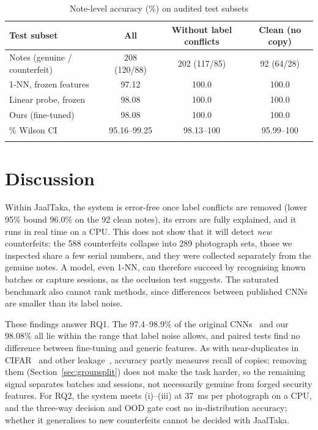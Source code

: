 \documentclass[pdflatex,iicol,sn-mathphys-num]{sn-jnl}
\begin{document}
\begin{table}[!tp]
\caption{Note-level accuracy (\%) on audited test subsets}\label{tab:clean}
\begin{tabular*}{\textwidth}{@{\extracolsep\fill}lccc}
\toprule
Test subset & All & Without label conflicts & Clean (no copy) \\
\midrule
Notes (genuine / counterfeit) & 208 (120/88) & 202 (117/85) & 92 (64/28) \\
\midrule
1-NN, frozen features & 97.12 & 100.0 & 100.0 \\
Linear probe, frozen & 98.08 & 100.0 & 100.0 \\
Ours (fine-tuned) & 98.08 & 100.0 & 100.0 \\
\quad 95\% Wilson CI & 95.16--99.25 & 98.13--100 & 95.99--100 \\
\botrule
\end{tabular*}
\end{table}

\section{Discussion}\label{sec:discussion}

Within JaalTaka, the system is error-free once label conflicts are removed (lower 95\%
bound 96.0\% on the 92 clean notes), its errors are fully explained, and it runs in real
time on a CPU. This does not show that it will detect \emph{new} counterfeits: the 588
counterfeits collapse into 289 photograph sets, those we inspected share a few serial
numbers, and they were collected separately from the genuine notes. A model, even 1-NN,
can therefore succeed by recognising known batches or capture sessions, as the occlusion
test suggests. The saturated benchmark also cannot rank methods, since differences
between published CNNs are smaller than its label noise.

These findings answer RQ1. The 97.4--98.9\% of the original
CNNs~\cite{piyas2025jaaltaka} and our 98.08\% all lie within the range that label noise
allows, and paired tests find no difference between fine-tuning and generic features.
As with near-duplicates in CIFAR~\cite{barz2020cifair} and other
leakage~\cite{kapoor2023leakage}, accuracy partly measures recall of copies; removing
them (Section~\ref{sec:groupsplit}) does not make the task harder, so the remaining
signal separates batches and sessions, not necessarily genuine from forged security
features. For RQ2, the system meets (i)--(iii) at 37~ms per photograph on a CPU, and the
three-way decision and OOD gate cost no in-distribution accuracy; whether it generalises
to new counterfeits cannot be decided with JaalTaka.
\end{document}
